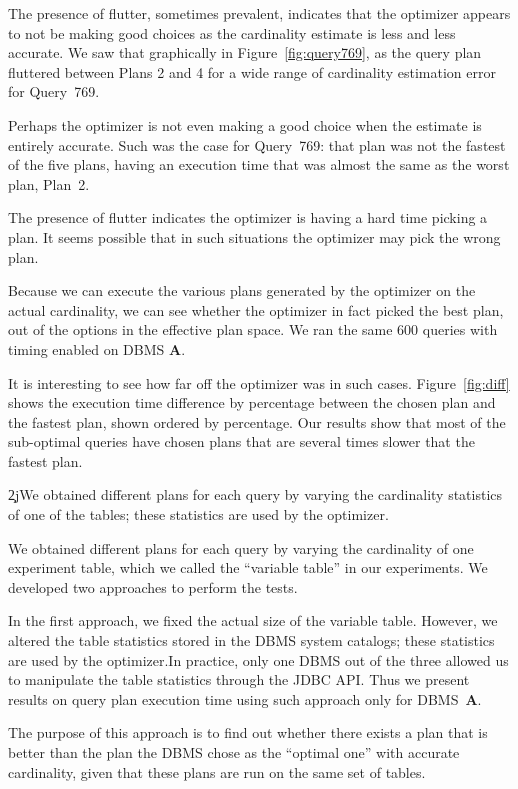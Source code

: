 The presence of flutter, sometimes prevalent, indicates that the optimizer
appears to not be making good choices as the cardinality estimate is less
and less accurate. We saw that graphically in Figure~\ref{fig:query769}, as
the query plan fluttered between Plans 2 and 4 for a wide range of
cardinality estimation error for Query~769.

Perhaps the optimizer is not even making a good choice when the estimate is
entirely accurate. Such was the case for Query~769: that plan was not the
fastest of the five plans, having an execution time that was almost the same 
as the worst plan, Plan~2.

The presence of flutter indicates the optimizer is having a hard time
picking a plan. It seems possible that in such situations the optimizer may
pick the wrong plan.

Because we can execute the various plans generated by the optimizer on the
actual cardinality, we can see whether the optimizer in fact picked the best
plan, out of the options in the effective plan space. We ran the same 600 queries 
with timing enabled on DBMS {\bf A}.

It is interesting to see how far off the optimizer
was in such cases. Figure~\ref{fig:diff} shows the execution time difference by percentage
between the chosen plan and the fastest plan, shown ordered by
percentage. Our results show that most of the sub-optimal queries have chosen plans 
that are several times slower that the fastest plan.

\c2j{We obtained different plans for each query by varying the cardinality
  statistics of one of the tables; these statistics are used by the optimizer.}{We obtained different plans for each query by varying the cardinality
of one experiment table, which we called the ``variable table'' in our
experiments. We developed two approaches to perform the tests.

In the first approach, we fixed the actual size of the variable table. However,
we altered the table statistics stored in the DBMS system catalogs; these
statistics are used by the optimizer.In practice, 
only one DBMS out of the three allowed us to manipulate the 
table statistics through the JDBC API. Thus we present results on 
query plan execution time using such approach only for DBMS~{\bf A}.}
The purpose of this approach is to find out whether there exists a plan
that is better than the plan the DBMS chose as the ``optimal one'' with
accurate cardinality, given that these plans are run on the same set of
tables.

